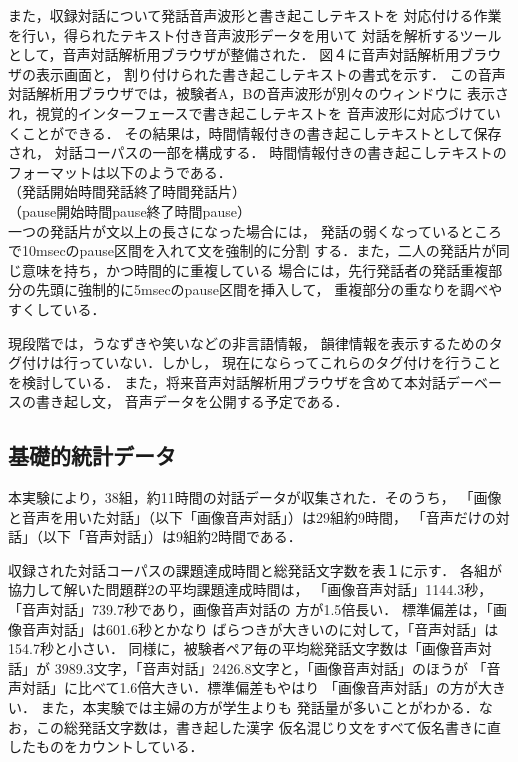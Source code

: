 また，収録対話について発話音声波形と書き起こしテキストを
対応付ける作業を行い，得られたテキスト付き音声波形データを用いて
対話を解析するツールとして，音声対話解析用ブラウザが整備された．
図４に音声対話解析用ブラウザの表示画面と，
割り付けられた書き起こしテキストの書式を示す．
この音声対話解析用ブラウザでは，被験者A，Bの音声波形が別々のウィンドウに
表示され，視覚的インターフェースで書き起こしテキストを
音声波形に対応づけていくことができる．
その結果は，時間情報付きの書き起こしテキストとして保存され，
対話コーパスの一部を構成する．
時間情報付きの書き起こしテキストのフォーマットは以下のようである．\\
\hspace*{1.0cm}（発話開始時間\hspace{0.75cm}発話終了時間\hspace{0.75cm}発話片）\\
\hspace*{1.0cm}（pause開始時間\hspace{0.5cm}pause終了時間\hspace{0.5cm}pause）\\
一つの発話片が文以上の長さになった場合には，
発話の弱くなっているところで10msecのpause区間を入れて文を強制的に分割
する．また，二人の発話片が同じ意味を持ち，かつ時間的に重複している
場合には，先行発話者の発話重複部分の先頭に強制的に5msecのpause区間を挿入して，
重複部分の重なりを調べやすくしている．

現段階では，うなずきや笑いなどの非言語情報，
韻律情報を表示するためのタグ付けは行っていない．しかし，
現在\cite{Araki.1997}にならってこれらのタグ付けを行うことを検討している．
また，将来音声対話解析用ブラウザを含めて本対話デーベースの書き起し文，
音声データを公開する予定である．



\vspace{-3mm}
\subsection{基礎的統計データ}

本実験により，38組，約11時間の対話データが収集された．そのうち，
「画像と音声を用いた対話」（以下「画像音声対話」）は29組約9時間，
「音声だけの対話」（以下「音声対話」）は9組約2時間である．

収録された対話コーパスの課題達成時間と総発話文字数を表１に示す．
各組が協力して解いた問題群2の平均課題達成時間は，
「画像音声対話」1144.3秒，「音声対話」739.7秒であり，画像音声対話の
方が1.5倍長い．
標準偏差は，「画像音声対話」は601.6秒とかなり
ばらつきが大きいのに対して，「音声対話」は154.7秒と小さい．
同様に，被験者ペア毎の平均総発話文字数は「画像音声対話」が
3989.3文字，「音声対話」2426.8文字と，「画像音声対話」のほうが
「音声対話」に比べて1.6倍大きい．標準偏差もやはり
「画像音声対話」の方が大きい．
また，本実験では主婦の方が学生よりも
発話量が多いことがわかる．なお，この総発話文字数は，書き起した漢字
仮名混じり文をすべて仮名書きに直したものをカウントしている．

